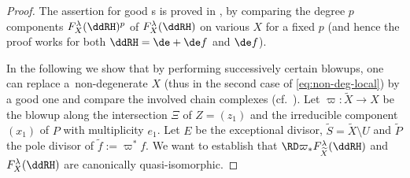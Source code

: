 \begin{proof} The assertion for good {\cpt}s is proved in \cite[Theorem~1.7]{Y}, by comparing the degree $p$ components $F_X^\lambda(\ddRH)^p$ of $F_X^\lambda(\ddRH)$ on various $X$ for a fixed $p$ (and hence the proof works for both $\ddRH = \de +\de f$ and $\de f$).

In the following we show that by performing successively certain blowups, one can replace a~non-degenerate {\cpt} $X$ (thus in the second case of \eqref{eq:non-deg-local}) by a good one and compare the involved chain complexes (cf.~\cite[Section~4($b$)]{Y}). Let $\varpi \colon \widetilde{X} \to X$ be the blowup along the intersection $\Xi$ of $Z = (z_1)$ and the irreducible component $(x_1)$ of $P$ with multiplicity $e_1$. Let $E$ be the exceptional divisor, $\widetilde{S} = \widetilde{X}\setminus U$ and $\widetilde{P}$ the pole divisor of $\tilde{f} := \varpi^*f$. We want to establish that $\RD\varpi_*F_{\widetilde{X}}^\lambda(\ddRH)$ and $F_X^\lambda(\ddRH)$ are canonically quasi-isomorphic.


\end{proof}
